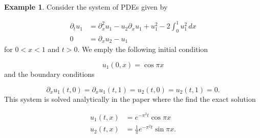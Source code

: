 \documentclass{CUP-JNL-DTM}%
\theoremstyle{definition}
\newtheorem{example}[theorem]{Example}
\numberwithin{equation}{section}
\begin{document}
\begin{example}

Consider the system of PDEs given by 

\begin{equation}
    \begin{split}
        \partial_t u_1 & = \partial_x^2 u_1 - u_2 \partial_x u_1 + u_1^2 - 2\int_0^1 u_1^2 \,dx \\
        0 & = \partial_x u_2 - u_1
    \end{split}
\end{equation}
for $0 < x < 1$ and $t > 0$. We emply the following initial condition

\begin{equation}
    u_1(0,x) = \cos \pi x
\end{equation}
and the boundary conditions

\begin{equation}
    \partial_x u_1(t,0) = \partial_x u_1(t,1) = u_2(t,0) = u_2(t,1) = 0. 
\end{equation}
This system is solved analytically in the paper \cite{benhammoudaAnalyticalSolutionsSystems2014} where the find the exact solution

\begin{equation}
    \begin{split}
        u_1(t,x) & = e^{-\pi^2t}\cos \pi x \\
        u_2(t,x) & = \frac{1}{\pi}e^{-\pi^2t} \sin \pi x. 
    \end{split}
\end{equation}

\end{example}
\end{document}
